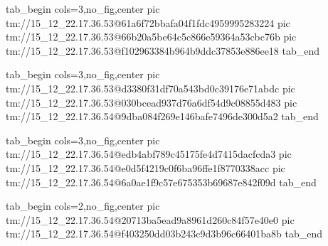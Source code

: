 \ifcmt
  tab_begin cols=3,no_fig,center
    pic tm://15_12_22.17.36.53@61a6f72bbafa04f1fdc4959995283224
    pic tm://15_12_22.17.36.53@66b20a5be64c5c866e59364a53cbc76b
    pic tm://15_12_22.17.36.53@f102963384b964b9ddc37853e886ee18
  tab_end
\fi


\ifcmt
  tab_begin cols=3,no_fig,center
    pic tm://15_12_22.17.36.53@d3380f31df70a543bd0c39176e71abdc
    pic tm://15_12_22.17.36.53@030bcead937d76a6df54d9c08855d483
    pic tm://15_12_22.17.36.54@9dba084f269e146bafe7496de300d5a2
  tab_end
\fi


\ifcmt
  tab_begin cols=3,no_fig,center
    pic tm://15_12_22.17.36.54@edb4abf789c45175fe4d7415dacfcda3
    pic tm://15_12_22.17.36.54@e0d5f4219c0f6ba96ffe1f8770338acc
    pic tm://15_12_22.17.36.54@6a0ae1f9c57e675353b69687e842f09d
  tab_end
\fi


\ifcmt
  tab_begin cols=2,no_fig,center
    pic tm://15_12_22.17.36.54@20713ba5ead9a8961d260c84f57e40e0
    pic tm://15_12_22.17.36.54@f403250dd03b243c9d3b96c66401ba8b
  tab_end
\fi

